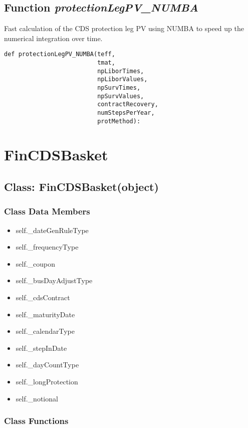 \documentclass[twoside,11pt]{book}
\begin{document}
\subsection{Function {\it protectionLegPV\_NUMBA}}
Fast calculation of the CDS protection leg PV using NUMBA to speed up the numerical integration over time. 

\begin{lstlisting}
def protectionLegPV_NUMBA(teff,
                          tmat,
                          npLiborTimes,
                          npLiborValues,
                          npSurvTimes,
                          npSurvValues,
                          contractRecovery,
                          numStepsPerYear,
                          protMethod):
\end{lstlisting}

\newpage
\section{FinCDSBasket}

\subsection{Class: FinCDSBasket(object)}


\subsubsection{Class Data Members}
\begin{itemize}
\item{self.\_dateGenRuleType}
\item{self.\_frequencyType}
\item{self.\_coupon}
\item{self.\_busDayAdjustType}
\item{self.\_cdsContract}
\item{self.\_maturityDate}
\item{self.\_calendarType}
\item{self.\_stepInDate}
\item{self.\_dayCountType}
\item{self.\_longProtection}
\item{self.\_notional}
\end{itemize}

\subsubsection{Class Functions}
\end{document}
